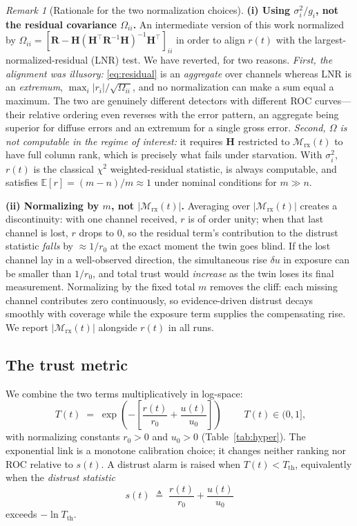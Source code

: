 \documentclass[journal]{IEEEtran}
\theoremstyle{plain}
\theoremstyle{definition}
\theoremstyle{remark}
\newtheorem{remark}{Remark}
\newcommand{\bH}{\mathbf{H}}
\newcommand{\Mrx}{\mathcal{M}_{\mathrm{rx}}}
\newcommand{\bR}{\mathbf{R}}
\begin{document}
\begin{remark}[Rationale for the two normalization choices]
\label{rem:residual}
\textbf{(i) Using $\sigma_i^{2}/g_i$, not the residual covariance
$\Omega_{ii}$.} An intermediate version of this work normalized by
$\Omega_{ii}=[\bR-\bH(\bH^{\top}\bR^{-1}\bH)^{-1}\bH^{\top}]_{ii}$ in
order to align $r(t)$ with the largest-normalized-residual (LNR) test. We
have reverted, for two reasons. \emph{First, the alignment was
illusory:} \eqref{eq:residual} is an \emph{aggregate} over channels
whereas LNR is an \emph{extremum}, $\max_i|r_i|/\sqrt{\Omega_{ii}}$, and
no normalization can make a sum equal a maximum. The two are genuinely
different detectors with different ROC curves---their relative ordering
even reverses with the error pattern, an aggregate being superior for
diffuse errors and an extremum for a single gross error. \emph{Second,
$\Omega$ is not computable in the regime of interest:} it requires
$\bH$ restricted to $\Mrx(t)$ to have full column rank, which is precisely
what fails under starvation. With $\sigma_i^{2}$, $r(t)$ is the classical
$\chi^{2}$ weighted-residual statistic, is always computable, and satisfies
$\mathbb{E}[r]=(m-n)/m\approx1$ under nominal conditions for $m\gg n$.

\textbf{(ii) Normalizing by $m$, not $|\Mrx(t)|$.} Averaging over
$|\Mrx(t)|$ creates a discontinuity: with one channel received, $r$ is of
order unity; when that last channel is lost, $r$ drops to $0$, so the
residual term's contribution to the distrust statistic \emph{falls} by
$\approx 1/r_0$ at the exact moment the twin goes blind. If the lost
channel lay in a well-observed direction, the simultaneous rise $\delta u$
in exposure can be smaller than $1/r_0$, and total trust would
\emph{increase} as the twin loses its final measurement. Normalizing by
the fixed total $m$ removes the cliff: each missing channel contributes
zero continuously, so evidence-driven distrust decays smoothly with
coverage while the exposure term supplies the compensating rise. We report
$|\Mrx(t)|$ alongside $r(t)$ in all runs.
\end{remark}

\subsection{The trust metric}
We combine the two terms multiplicatively in log-space:
\begin{equation}
\boxed{\;T(t)\;=\;\exp\!\left(-\left[\frac{r(t)}{r_0}+\frac{u(t)}{u_0}\right]\right)\;}
\qquad T(t)\in(0,1],
\label{eq:trust}
\end{equation}
with normalizing constants $r_0>0$ and $u_0>0$ (Table~\ref{tab:hyper}).
The exponential link is a monotone calibration choice; it changes neither
ranking nor ROC relative to $s(t)$. A distrust alarm is raised when
$T(t)<T_{\mathrm{th}}$, equivalently when the \emph{distrust statistic}
\begin{equation}
s(t)\;\triangleq\;\frac{r(t)}{r_0}+\frac{u(t)}{u_0}
\label{eq:statistic}
\end{equation}
exceeds $-\ln T_{\mathrm{th}}$.
\end{document}
